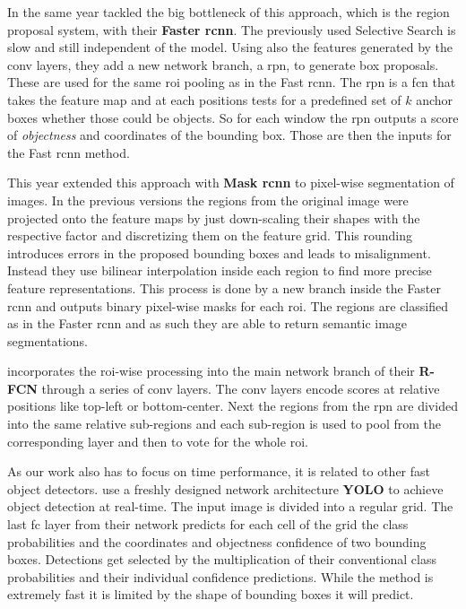 In the same year \citet{ren_faster_2015} tackled the big bottleneck of this approach, which is the region proposal system, with their \textbf{Faster \gls{rcnn}}. The previously used Selective Search is slow and still independent of the model. Using also the features generated by the \gls{conv} layers, they add a new network branch, a \gls{rpn}, to generate box proposals. These are used for the same \gls{roi} pooling as in the Fast \gls{rcnn}. The \gls{rpn} is a \gls{fcn} that takes the feature map and at each positions tests for a predefined set of $k$ anchor boxes whether those could be objects. So for each window the \gls{rpn} outputs a score of \textit{objectness} and coordinates of the bounding box. Those are then the inputs for the Fast \gls{rcnn} method.

This year \citet{he_mask_2017} extended this approach with \textbf{Mask \gls{rcnn}} to pixel-wise segmentation of images. In the previous versions the regions from the original image were projected onto the feature maps by just down-scaling their shapes with the respective factor and discretizing them on the feature grid. This rounding introduces errors in the proposed bounding boxes and leads to misalignment. Instead they use bilinear interpolation inside each region to find more precise feature representations. This process is done by a new branch inside the Faster \gls{rcnn} and outputs binary pixel-wise masks for each \gls{roi}. The regions are classified as in the Faster \gls{rcnn} and as such they are able to return semantic image segmentations.

\citet{dai_r-fcn:_2016} incorporates the \gls{roi}-wise processing into the main network branch of their \textbf{R-FCN} through a series of \gls{conv} layers. The \gls{conv} layers encode scores at relative positions like top-left or bottom-center. Next the regions from the \gls{rpn} are divided into the same relative sub-regions and each sub-region is used to pool from the corresponding layer and then to vote for the whole \gls{roi}.

As our work also has to focus on time performance, it is related to other fast object detectors. \citet{redmon_you_2016} use a freshly designed network architecture \textbf{YOLO} to achieve object detection at real-time. The input image is divided into a regular grid. The last \gls{fc} layer from their network predicts for each cell of the grid the class probabilities and the coordinates and objectness confidence of two bounding boxes. Detections get selected by the multiplication of their conventional class probabilities and their individual confidence predictions. While the method is extremely fast it is limited by the shape of bounding boxes it will predict.
\clearpage
